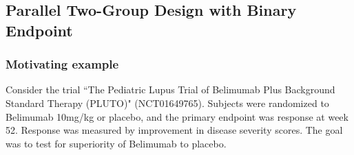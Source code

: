 \documentclass[12pt]{article}
\begin{document}

\subsection{Parallel Two-Group Design with Binary Endpoint}
\subsubsection{Motivating example}
Consider the trial ``The Pediatric Lupus Trial of Belimumab Plus Background Standard Therapy (PLUTO)" (NCT01649765). Subjects were randomized to Belimumab 10mg/kg or placebo, and the primary endpoint was response at week 52. Response was measured by improvement in disease severity scores. The goal was to test for superiority of Belimumab to placebo. 
\end{document}
